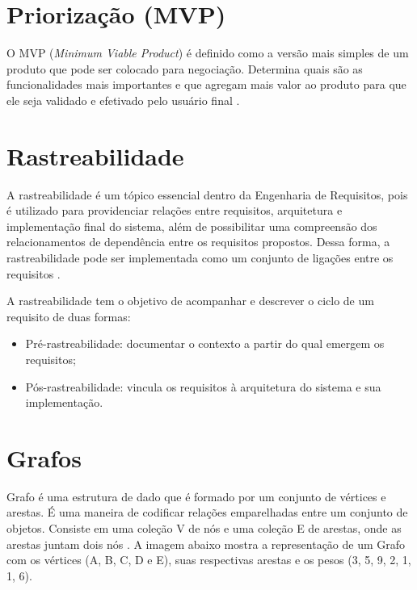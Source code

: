 \section{Priorização (MVP)}
O MVP (\textit{Minimum Viable Product}) é definido como a versão mais simples de um produto que pode ser colocado para negociação. Determina quais são as funcionalidades mais importantes e que agregam mais valor ao produto para que ele seja validado e efetivado pelo usuário final \cite{carolipaulo2018}.

\section {Rastreabilidade}
A rastreabilidade é um tópico essencial dentro da Engenharia de Requisitos, pois é utilizado para providenciar relações entre requisitos, arquitetura e implementação final do sistema, além de possibilitar uma compreensão dos relacionamentos de dependência entre os requisitos propostos. Dessa forma, a rastreabilidade pode ser implementada como um conjunto de ligações entre os requisitos \cite{sayao2006rastreabilidade}.

A rastreabilidade tem o objetivo de acompanhar e descrever o ciclo de um requisito de duas formas:
\begin{itemize}
    \item Pré-rastreabilidade: documentar o contexto a partir do qual emergem os requisitos;
    \item Pós-rastreabilidade: vincula os requisitos à arquitetura do sistema e sua implementação.
\end{itemize}

\section{Grafos}

Grafo é uma estrutura de dado que é formado por um conjunto de vértices e arestas. É uma maneira de codificar relações emparelhadas entre um conjunto de objetos. Consiste em uma coleção V de nós e uma coleção E de arestas, onde as arestas juntam dois nós \cite{Kleinberg+Tardos:06a}. A imagem abaixo mostra a representação de um Grafo com os vértices (A, B, C, D e E), suas respectivas arestas e os pesos (3, 5, 9, 2, 1, 1, 6).


